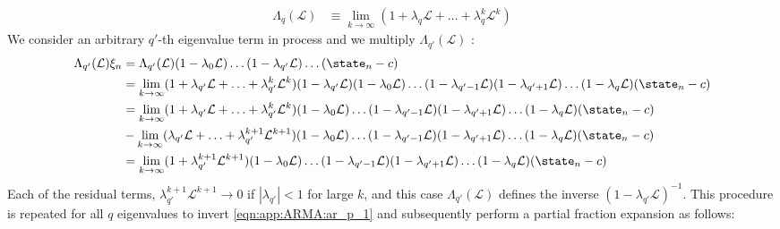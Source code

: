 \begin{align}
\Lambda_q(\mathcal{L}) & \equiv \lim_{k\to \infty} (1 + \lambda_q \mathcal{L} + \hdots + \lambda_q^k\mathcal{L}^k)
\end{align}
We consider an arbitrary $q'$-th eigenvalue term in process and we multiply $\Lambda_{q'}(\mathcal{L})$ :
\begin{align}
 \Lambda_{q'}(\mathcal{L}) \xi_n &= 
 \Lambda_{q'}(\mathcal{L}) (1 - \lambda_{0} \mathcal{L}) \hdots (1 - \lambda_{q'} \mathcal{L}) \hdots(\state_n - c) \\
 & = \lim_{k\to \infty} (1 + \lambda_{q'} \mathcal{L} + \hdots + \lambda_{q'}^k\mathcal{L}^k)  (1 - \lambda_{q'} \mathcal{L})(1 - \lambda_{0} \mathcal{L}) \hdots (1 - \lambda_{q'-1} \mathcal{L})  (1 - \lambda_{q'+1} \mathcal{L}) \hdots(1 - \lambda_{q} \mathcal{L})(\state_n - c) \\
 & = \lim_{k\to \infty} (1 + \lambda_{q'} \mathcal{L} + \hdots + \lambda_{q'}^k\mathcal{L}^k)(1 - \lambda_{0} \mathcal{L}) \hdots (1 - \lambda_{q'-1} \mathcal{L})  (1 - \lambda_{q'+1} \mathcal{L}) \hdots(1 - \lambda_{q} \mathcal{L})(\state_n - c) \\
  & - \lim_{k\to \infty} (\lambda_{q'} \mathcal{L} + \hdots + \lambda_{q'}^{k+1}\mathcal{L}^{k+1})(1 - \lambda_{0} \mathcal{L}) \hdots (1 - \lambda_{q'-1} \mathcal{L})  (1 - \lambda_{q'+1} \mathcal{L}) \hdots(1 - \lambda_{q} \mathcal{L})(\state_n - c) \\
& = \lim_{k\to \infty}(1 + \lambda_{q'}^{k+1}\mathcal{L}^{k+1}) (1 - \lambda_{0} \mathcal{L}) \hdots (1 - \lambda_{q'-1} \mathcal{L})  (1 - \lambda_{q'+1} \mathcal{L})\hdots (1 - \lambda_{q} \mathcal{L})(\state_n - c)
\end{align}
Each of the residual terms,  $\lambda_{q'}^{k+1}\mathcal{L}^{k+1} \to 0 $ if $|\lambda_{q'}| < 1$  for large $k$, and this case $\Lambda_{q'}(\mathcal{L})$ defines the inverse $(1 - \lambda_{q'} \mathcal{L})^{-1}$. This procedure is repeated for all $q$ eigenvalues to invert \cref{eqn:app:ARMA:ar_p_1} and subsequently perform a partial fraction expansion as follows:
